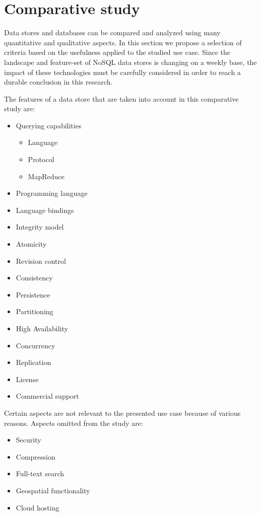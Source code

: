 \section{Comparative study}
\label{sec:comparative-study}

Data stores and databases can be compared and analyzed using many quantitative and qualitative aspects.
In this section we propose a selection of criteria based on the usefulness applied to the studied use case.
Since the landscape and feature-set of NoSQL data stores is changing on a weekly base, the impact of these technologies must be carefully considered in order to reach a durable conclusion in this research.

The features of a data store that are taken into account in this comparative study are:

\begin{itemize}
  \item Querying capabilities
    \begin{itemize}
      \item Language
      \item Protocol
      \item MapReduce
    \end{itemize}

  \item Programming language
  \item Language bindings

  \item Integrity model
  \item Atomicity
  \item Revision control
  \item Consistency

  \item Persistence
  \item Partitioning
  \item High Availability
  \item Concurrency
  \item Replication

  \item License
  \item Commercial support
\end{itemize}

Certain aspects are not relevant to the presented use case because of various reasons.
Aspects omitted from the study are:

\begin{itemize}
  \item Security
  \item Compression
  \item Full-text search
  \item Geospatial functionality
  \item Cloud hosting
\end{itemize}

